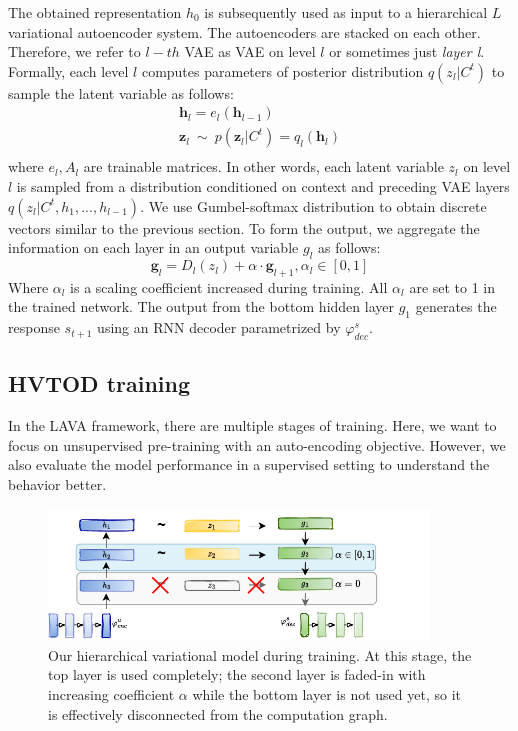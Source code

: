 The obtained representation $h_0$ is subsequently used as input to a hierarchical $L$ variational autoencoder system.
The autoencoders are stacked on each other.
Therefore, we refer to $l-th$ VAE as VAE on level $l$ or sometimes just \emph{layer l}.
Formally, each level $l$ computes parameters of posterior distribution $q(z_l|C^t)$ to sample the latent variable as follows:
\begin{equation}
\begin{split}    
    \mathbf{h}_l = e_l(\mathbf{h}_{l-1}) \\
    \mathbf{z}_l~\mathtt{\sim}~p(\mathbf{z}_l|C^t) = q_l(\mathbf{h}_l) \\
\end{split}
\end{equation}
where $e_l, A_l$ are trainable matrices.
In other words, each latent variable $z_l$ on level $l$ is sampled from a  distribution conditioned on context and preceding VAE layers $q(z_l|C^t,h_1,...,h_{l-1})$.
We use Gumbel-softmax distribution to obtain discrete vectors similar to the previous section.
To form the output, we aggregate the information on each layer in an output variable $g_l$ as follows:
\begin{equation}
\mathbf{g}_l = D_l(z_l) + \alpha \cdot \mathbf{g}_{l+1}, \alpha_l \in [0, 1]
\end{equation}
Where $\alpha_l$ is a scaling coefficient increased during training. All $\alpha_l$ are set to 1 in the trained network.
The output from the bottom hidden layer $g_1$ generates the response $s_{t+1}$  using an RNN decoder parametrized by $\varphi^s_{dec}$.

\subsection{HVTOD training}
In the LAVA framework, there are multiple stages of training.
Here, we want to focus on unsupervised pre-training with an auto-encoding objective.
However, we also evaluate the model performance in a supervised setting to understand the behavior better.
\begin{figure}[h]
    \centering
    \includegraphics[width=0.9\textwidth]{images/HLAVA-fadein.pdf}
    \caption{Our hierarchical variational model during training. At this stage, the top layer is used completely; the second layer is faded-in with increasing coefficient $\alpha$ while the bottom layer is not used yet, so it is effectively disconnected from the computation graph.}
    \label{05:fig:HVTOD-fadein}
\end{figure}

